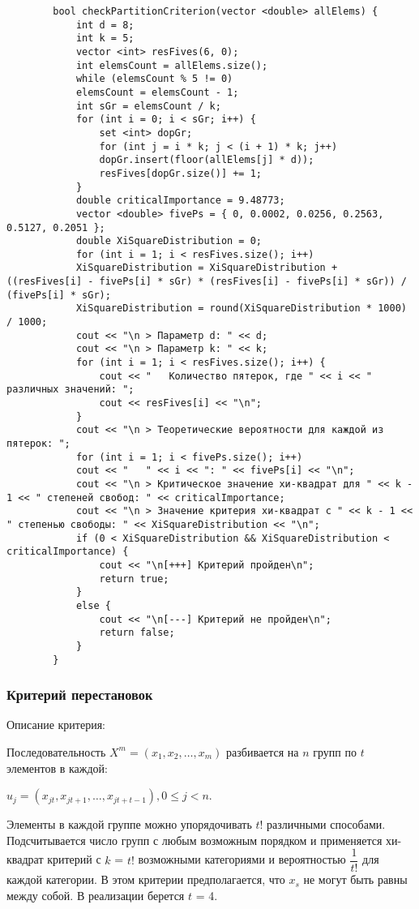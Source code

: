 \documentclass[bachelor, och, coursework]{shiza}
\begin{document}
	\begin{verbatim}
		bool checkPartitionCriterion(vector <double> allElems) {
			int d = 8;
			int k = 5;
			vector <int> resFives(6, 0);
			int elemsCount = allElems.size();
			while (elemsCount % 5 != 0)
			elemsCount = elemsCount - 1;
			int sGr = elemsCount / k;
			for (int i = 0; i < sGr; i++) {
				set <int> dopGr;
				for (int j = i * k; j < (i + 1) * k; j++)
				dopGr.insert(floor(allElems[j] * d));
				resFives[dopGr.size()] += 1;
			}
			double criticalImportance = 9.48773;
			vector <double> fivePs = { 0, 0.0002, 0.0256, 0.2563, 0.5127, 0.2051 };
			double XiSquareDistribution = 0;
			for (int i = 1; i < resFives.size(); i++)
			XiSquareDistribution = XiSquareDistribution + ((resFives[i] - fivePs[i] * sGr) * (resFives[i] - fivePs[i] * sGr)) / (fivePs[i] * sGr);
			XiSquareDistribution = round(XiSquareDistribution * 1000) / 1000;
			cout << "\n > Параметр d: " << d;
			cout << "\n > Параметр k: " << k;
			for (int i = 1; i < resFives.size(); i++) {
				cout << "   Количество пятерок, где " << i << " различных значений: ";
				cout << resFives[i] << "\n";
			}
			cout << "\n > Теоретические вероятности для каждой из пятерок: ";
			for (int i = 1; i < fivePs.size(); i++)
			cout << "   " << i << ": " << fivePs[i] << "\n";
			cout << "\n > Критическое значение хи-квадрат для " << k - 1 << " степеней свобод: " << criticalImportance;
			cout << "\n > Значение критерия хи-квадрат с " << k - 1 << " степенью свободы: " << XiSquareDistribution << "\n";
			if (0 < XiSquareDistribution && XiSquareDistribution < criticalImportance) {
				cout << "\n[+++] Критерий пройден\n";
				return true;
			}
			else {
				cout << "\n[---] Критерий не пройден\n";
				return false;
			}
		}
	\end{verbatim}
	
	\subsubsection{Критерий перестановок}
	
	Описание критерия:

	Последовательность $X^m=(x_1, x_2, \dots, x_m)$ разбивается на $n$ групп по $t$ элементов в каждой:
			\begin{center}
				$u_j = (x_{jt}, x_{jt+1}, \dots, x_{jt+t-1} ), 0 \leq j < n$.
			\end{center}
	
	Элементы в каждой группе можно упорядочивать $t!$ различными способами. Подсчитывается число групп с любым возможным порядком и применяется хи-квадрат критерий с $k$ = $t!$ возможными категориями и вероятностью $\dfrac{1}{t!}$ для каждой категории. В этом критерии предполагается, что $x_s$ не могут быть равны между собой. В реализации берется $t$ = 4. \
	
\end{document}
